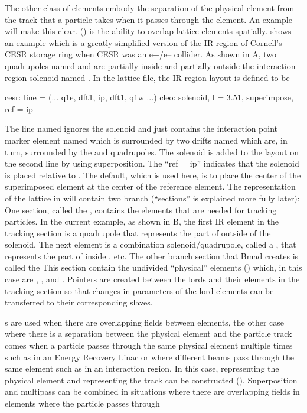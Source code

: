 The other class of  elements embody the separation of the
physical element from the track that a particle takes when it passes
through the element. An example will make this clear.
 () is the ability to overlap lattice
elements spatially.  shows an example which is a
greatly simplified version of the IR region of Cornell's CESR storage
ring when CESR was an e+/e-- collider. As shown in A,
two quadrupoles named  and  are partially inside and
partially outside the interaction region solenoid named . In
the lattice file, the IR region layout is defined to be
 {\small
\begin{example}
  cesr: line = (... q1e, dft1, ip, dft1, q1w ...)
  cleo: solenoid, l = 3.51, superimpose, ref = ip
\end{example}
 }
The line named  ignores the solenoid and just contains the
interaction point marker element named  which is surrounded by
two drifts named  which are, in turn, surrounded by the
 and  quadrupoles. The solenoid is added to the layout
on the second line by using superposition. The ``ref = ip'' indicates
that the solenoid is placed relative to . The default, which is
used here, is to place the center of the superimposed 
element at the center of the  reference element.  The
representation of the lattice in \bmad will contain two branch
 (``sections'' is explained more fully later): One
section, called the , contains the elements that
are needed for tracking particles. In the current example, as shown in
B, the first IR element in the tracking section is a
quadrupole that represents the part of  outside of the
solenoid. The next element is a combination solenoid/quadrupole,
called a , that represents the part of  inside
, etc.  The other branch section that Bmad creates is called
the  This section contain the undivided ``physical''
 elements () which, in this case are
, , and . Pointers are created between the
lords and their  elements in the tracking section so
that changes in parameters of the lord elements can be transferred to
their corresponding slaves.

s are used when there are overlapping fields between
elements, the other case where there is a separation between the
physical element and the particle track comes when a particle passes
through the same physical element multiple times such as in an Energy
Recovery Linac or where different beams pass through the same element
such as in an interaction region. In this case, 
representing the physical element and 
representing the track can be constructed ().
Superposition and multipass can be combined in situations where there
are overlapping fields in elements where the particle passes through

